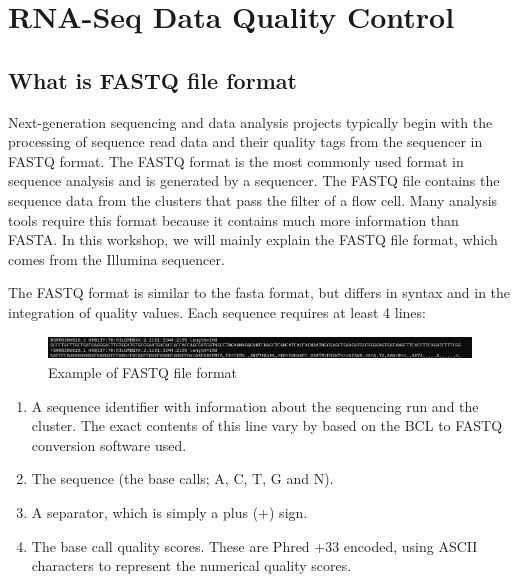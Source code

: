 \documentclass[
  letterpaper,
  DIV=11,
  numbers=noendperiod]{scrreprt}
\begin{document}

\hypertarget{rna-seq-data-quality-control}{%
\chapter{RNA-Seq Data Quality
Control}\label{rna-seq-data-quality-control}}

\hypertarget{what-is-fastq-file-format}{%
\section{What is FASTQ file format}\label{what-is-fastq-file-format}}

Next-generation sequencing and data analysis projects typically begin
with the processing of sequence read data and their quality tags from
the sequencer in FASTQ format. The FASTQ format is the most commonly
used format in sequence analysis and is generated by a sequencer. The
FASTQ file contains the sequence data from the clusters that pass the
filter of a flow cell. Many analysis tools require this format because
it contains much more information than FASTA. In this workshop, we will
mainly explain the FASTQ file format, which comes from the Illumina
sequencer.

The FASTQ format is similar to the fasta format, but differs in syntax
and in the integration of quality values. Each sequence requires at
least 4 lines:

\begin{figure}

{\centering \includegraphics{assets/12_fastq_format.png}

}

\caption{Example of FASTQ file format}

\end{figure}

\begin{enumerate}
\def\labelenumi{\arabic{enumi}.}
\item
  A sequence identifier with information about the sequencing run and
  the cluster. The exact contents of this line vary by based on the BCL
  to FASTQ conversion software used.
\item
  The sequence (the base calls; A, C, T, G and N).
\item
  A separator, which is simply a plus (+) sign.
\item
  The base call quality scores. These are Phred +33 encoded, using ASCII
  characters to represent the numerical quality scores.
\end{enumerate}
\end{document}

